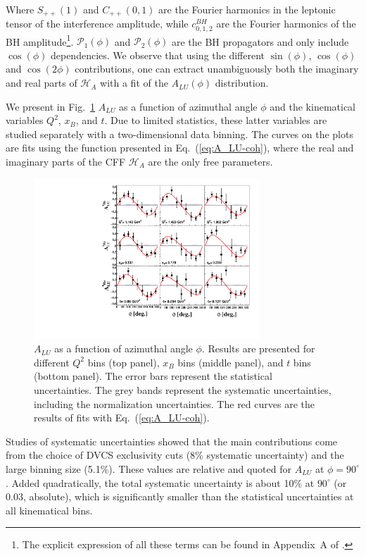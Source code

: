 \documentclass[twocolumn,nofootinbib,showpacs,prl,superscriptaddress,secnumarabic,amssymb,nobibnotes,aps,floatfix]{revtex4}
\begin{document}
Where $S_{++}(1)$ and $C_{++}(0,1)$ are the Fourier harmonics in the 
leptonic tensor of the interference amplitude, while $c_{0,1,2}^{BH}$ 
are the Fourier harmonics of the BH amplitude\footnote{The explicit 
expression of all these terms can be found in Appendix~A of \cite{Armstrong:2017wfw}.}.
${\mathcal P}_1(\phi)$ and ${\mathcal P}_2(\phi)$ are the BH
propagators and only include $\cos(\phi)$ dependencies.
We observe that using the different $\sin(\phi)$, $\cos(\phi)$ and $\cos(2\phi)$ contributions, 
one can extract unambiguously both the imaginary and real parts of $\mathcal{H}_{A}$
with a fit of the $A_{LU}(\phi)$ distribution.

We present in Fig.~\ref{fig:alu} $A_{LU}$ as a function of azimuthal angle 
$\phi$ and the kinematical variables $Q^2$, $x_B$, and $t$. Due to limited 
statistics, these latter variables are studied separately with a two-dimensional 
data binning. The curves on 
the plots are fits using the function presented in Eq.~(\ref{eq:A_LU-coh}), 
where the real and imaginary parts of the CFF $\mathcal{H}_{A}$ are the only 
free parameters. 

\begin{figure}[tb]
   \centering
\includegraphics[width=8.5cm]{F_Coherent_ALU_phi.pdf}
\caption{$A_{LU}$ as a function of azimuthal angle $\phi$. Results are presented
   for different $Q^{2}$ bins (top panel), $x_{B}$ bins (middle panel), and $t$ 
   bins (bottom panel).  The error bars represent the statistical 
   uncertainties. The grey bands represent the systematic uncertainties, 
   including the normalization uncertainties. The red curves are the results of 
   fits with Eq.~(\ref{eq:A_LU-coh}).}
\label{fig:alu}
\end{figure}

Studies of systematic uncertainties showed that the main contributions 
come from the choice of DVCS exclusivity cuts (8\% systematic uncertainty) and the 
large binning size (5.1\%). These values are relative and quoted for $A_{LU}$
at $\phi=90^\circ$. Added quadratically, the total systematic uncertainty
is about 10\% at $90^\circ$ (or 0.03, absolute), which is significantly smaller
than the statistical uncertainties at all kinematical bins. 
\end{document}
